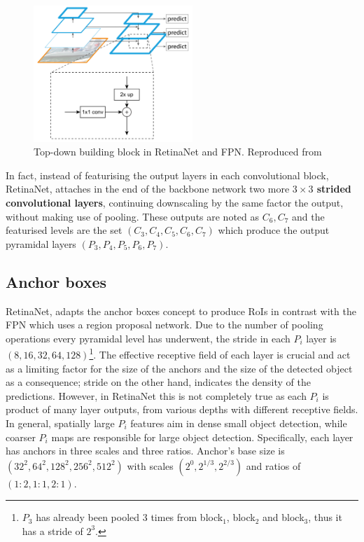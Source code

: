 \begin{figure}[!htb]
  \centering
  \includegraphics[width=6cm]{../figures/ch2/fig10.png}
  \caption{Top-down building block in RetinaNet and FPN. Reproduced from \cite{lin2017feature}}
  \label{fig10}
\end{figure} 

In fact, instead of featurising the output layers in each convolutional block, RetinaNet, attaches in the end of the backbone network two more \textbf{$3\times3$ strided convolutional layers}, continuing downscaling by the same factor the output, without making use of pooling. These outputs are noted as $C_6,C_7$ and the featurised levels are the set $(C_3, C_4, C_5, C_6, C_7)$ which produce the output pyramidal layers $(P_3, P_4, P_5, P_6, P_7)$.

\subsection{Anchor boxes}
RetinaNet, adapts the anchor boxes concept to produce RoIs in contrast with the FPN which uses a region proposal network. Due to the number of pooling operations every pyramidal level has underwent, the stride in each $P_i$ layer is $(8, 16, 32, 64, 128)$\footnote{$P_3$ has already been pooled 3 times from block$_1$, block$_2$ and block$_3$, thus it has a stride of $2^3$.}. The effective receptive field of each layer is crucial and act as a limiting factor for the size of the anchors and the size of the detected object as a consequence; stride on the other hand, indicates the density of the predictions. However, in RetinaNet this is not completely true as each $P_i$ is product of many layer outputs, from various depths with different receptive fields. In general, spatially large $P_i$ features aim in dense small object detection, while coarser $P_i$ maps are responsible for large object detection. Specifically, each layer has anchors in three scales and three ratios. Anchor's base size is $(32^2, 64^2, 128^2, 256^2, 512^2)$ with scales $(2^0, 2^{1/3}, 2^{2/3})$ and ratios of $(1\!:\!2,1\!:\!1,2\!:\!1)$.

